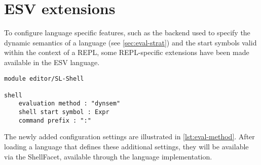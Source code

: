 \section{ESV extensions}
\label{sec:esv-extensions}

To configure language specific features, such as the backend used to specify
the dynamic semantics of a language (see \cref{sec:eval-strat}) and the start
symbols valid within the context of a REPL, some REPL-specific extensions have
been made available in the ESV language.

\begin{lstlisting}[language=esv,caption={Configuring language specific settings.},label={lst:eval-method}]
module editor/SL-Shell

shell
    evaluation method : "dynsem"
    shell start symbol : Expr
    command prefix : ":"
\end{lstlisting}

The newly added configuration settings are illustrated in \cref{lst:eval-method}.
After loading a language that defines these additional settings, they will
be available via the ShellFacet, available through the language implementation.
